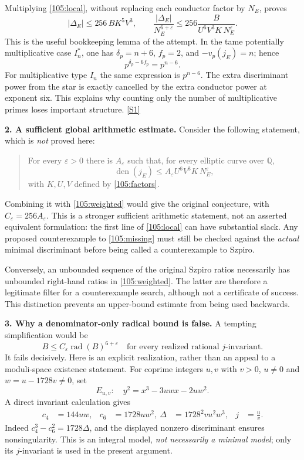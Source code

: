 \documentclass[11pt,a4paper]{article}
\newcommand{\Q}{\mathbb{Q}}
\newcommand{\sref}[2]{\hyperlink{source:#1:#2}{[S#2]}}
\numberwithin{equation}{section}
\begin{document}
Multiplying \eqref{105:local}, without replacing each conductor factor by
$N_E$, proves
\begin{equation}\label{105:weighted}
 |\Delta_E|\leq 256\,B K^5V^3,
 \qquad
 \frac{|\Delta_E|}{N_E^{6+\varepsilon}}
 \leq256\frac{B}{U^6V^3K\,N_E^\varepsilon}.
\end{equation}
This is the useful bookkeeping lemma of the attempt. In the tame
potentially multiplicative case $I_n^*$, one has
$\delta_p=n+6$, $f_p=2$, and $-v_p(j_E)=n$; hence
\[
 p^{\delta_p-6f_p}=p^{n-6}.
\]
For multiplicative type $I_n$ the same expression is $p^{n-6}$.
The extra discriminant power from the star is exactly cancelled by the
extra conductor power at exponent six. This explains why counting only the
number of multiplicative primes loses important structure.
\sref{105}{1}

\medskip
\textbf{2. A sufficient global arithmetic estimate.}
Consider the following statement, which is \emph{not} proved here:
\begin{quote}
For every $\varepsilon>0$ there is $A_\varepsilon$ such that, for every
elliptic curve over $\Q$,
\begin{equation}\label{105:missing}
 \operatorname{den}(j_E)\leq
 A_\varepsilon U^6V^3K\,N_E^\varepsilon,
\end{equation}
with $K,U,V$ defined by \eqref{105:factors}.
\end{quote}
Combining it with \eqref{105:weighted} would give the original conjecture,
with $C_\varepsilon=256A_\varepsilon$. This is a stronger sufficient
arithmetic statement, not an asserted equivalent formulation: the first
line of \eqref{105:local} can have substantial slack. Any proposed
counterexample to \eqref{105:missing} must still be checked against the
\emph{actual} minimal discriminant before being called a counterexample to
Szpiro.

Conversely, an unbounded sequence of the original Szpiro ratios necessarily
has unbounded right-hand ratios in \eqref{105:weighted}. The latter are
therefore a legitimate filter for a counterexample search, although not a
certificate of success. This distinction prevents an upper-bound estimate
from being used backwards.

\medskip
\textbf{3. Why a denominator-only radical bound is false.}
A tempting simplification would be
\begin{equation}\label{105:false}
 B\leq C_\varepsilon\operatorname{rad}(B)^{6+\varepsilon}
 \quad\text{for every realized rational $j$-invariant.}
\end{equation}
It fails decisively. Here is an explicit realization, rather than an appeal
to a moduli-space existence statement. For coprime integers $u,v$ with
$v>0$, $u\neq0$ and $w=u-1728v\neq0$, set
\[
 E_{u,v}:\quad y^2=x^3-3uwx-2uw^2.
\]
A direct invariant calculation gives
\begin{align}
 c_4&=144uw, &c_6&=1728uw^2,\
 \Delta&=1728^2vu^2w^3, &j&=\frac uv. \label{105:jmodel}
\end{align}
Indeed $c_4^3-c_6^2=1728\Delta$, and the displayed nonzero discriminant
ensures nonsingularity. This is an integral model, \emph{not necessarily a
minimal model}; only its $j$-invariant is used in the present argument.
\end{document}
